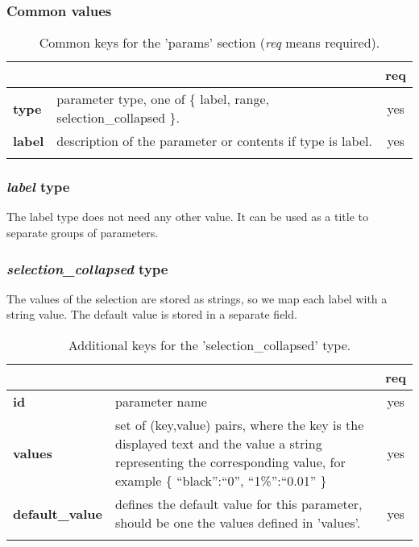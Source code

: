 \subsubsection{Common values}

\begin{longtable}{|>{\bf}L{\linewidth}|L{\linewidth}|c|}
\hline
      &  & {\bf req} 
\tabularnewline \hline \hline
 type  & parameter type, one of \{ label, range, selection\_collapsed \}.
                     & yes \\ \hline
 label & description of the parameter or contents if type is label. & yes
                      \\ \hline
\caption{Common keys for the 'params' section ({\em req} means required).}
\end{longtable}


\subsubsection{ \emph{label} type}
The label type does not need any other value. It can be used as a title to 
separate groups of parameters.

\subsubsection{ \emph{selection\_collapsed} type}

The values of the selection are stored as strings, so we map each label with a 
string value. The default value is stored in a separate field.

\begin{longtable}{|>{\bf}L{\linewidth}|L{\linewidth}|c|}
\hline
      &  & {\bf req} 
\tabularnewline \hline \hline
 id     & parameter name  & yes \\ \hline
 values & set of (key,value) pairs, where the key is the displayed text and the 
value a string representing the corresponding value, for example \{ 
``black'':``0'', ``1\%'':``0.01'' \} & yes
                      \\ \hline
 default\_value & defines the default value for this parameter, should be one 
the values defined in 'values'. & yes \\ \hline
\caption{Additional keys for the 'selection\_collapsed' type.}
\end{longtable}

